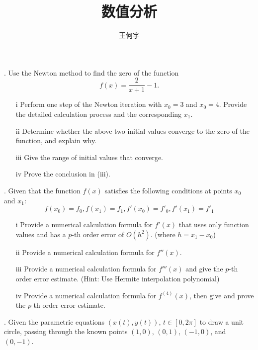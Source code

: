 \documentclass[a4paper]{ctexart}
\title{数值分析}
\author{王何宇}
\date{}
\begin{document}
\maketitle
\pagestyle{empty}




. Use the Newton method to find the zero of the function 
\[ 
f(x) = \frac{2}{x+1} - 1. 
\]
\begin{enumerate}
    \item[i] Perform one step of the Newton iteration with \( x_0 = 3 \) 
    and \( x_0 = 4 \). Provide the detailed calculation process 
    and the corresponding \( x_1 \).
    \item[ii] Determine whether the above two initial values 
    converge to the zero of the function, and explain why.
    \item[iii] Give the range of initial values that converge.
    \item[iv] Prove the conclusion in (iii). 
\end{enumerate}


. Given that the function \( f(x) \) satisfies 
the following conditions at points \( x_0 \) and \( x_1 \):
\[ 
    f(x_0) = f_0, f(x_1) = f_1, f'(x_0) = f'_0, f'(x_1) = f'_1 
\]
\begin{enumerate}
    \item[i] Provide a numerical calculation formula for \( f'(x) \) 
    that uses only function values and has a \( p \)-th order error 
    of \( O(h^2) \). (where \( h = x_1 - x_0 \))
    \item[ii] Provide a numerical calculation formula for \( f''(x) \).
    \item[iii] Provide a numerical calculation formula for \( f'''(x) \) 
    and give the \( p \)-th order error estimate. 
    (Hint: Use Hermite interpolation polynomial)
    \item[iv] Provide a numerical calculation formula for 
    \( f^{(4)}(x) \), then give and prove the \( p \)-th order error estimate.
\end{enumerate}


. Given the parametric equations \( (x(t), y(t)) \), 
\( t \in [0, 2\pi] \) to draw a unit circle, 
passing through the known points \( (1,0) \), \( (0,1) \), \( (-1,0) \), 
and \( (0,-1) \).
\end{document}
